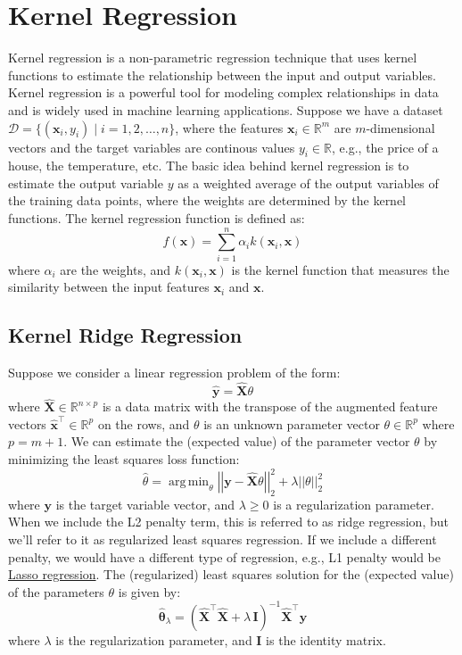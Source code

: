 \documentclass{article}[11pt]
\def\R{\mathbb{R}}
\def\D{\mathcal{D}}
\newcommand{\norm}[1]{\left|\left|#1\right|\right|}
\DeclareMathOperator*{\argmin}{arg\,min}
\begin{document}
\section{Kernel Regression}
Kernel regression is a non-parametric regression technique that uses kernel functions to estimate the relationship between the input and output variables.
Kernel regression is a powerful tool for modeling complex relationships in data and is widely used in machine learning applications.
Suppose we have a dataset $\D = \{(\mathbf{x}_{i},y_{i}) \mid i = 1,2,\dots,n\}$, where the features $\mathbf{x}_i \in \mathbb{R}^{m}$ 
are $m$-dimensional vectors and the target variables are continous values $y_i \in \mathbb{R}$, e.g., the price of a house, the temperature, etc.
The basic idea behind kernel regression is to estimate the output variable $y$ as a weighted average of the output variables of the training data points, 
where the weights are determined by the kernel functions. The kernel regression function is defined as:
\begin{equation}
f(\mathbf{x}) = \sum_{i=1}^{n} \alpha_i k(\mathbf{x}_i, \mathbf{x})
\end{equation}
where $\alpha_i$ are the weights, and $k(\mathbf{x}_i, \mathbf{x})$ is the kernel function that measures the similarity between the input features $\mathbf{x}_i$ and $\mathbf{x}$.

\subsection{Kernel Ridge Regression}
Suppose we consider a linear regression problem of the form:
\begin{equation}
\hat{\mathbf{y}} = \hat{\mathbf{X}}\theta
\end{equation}
where $\hat{\mathbf{X}}\in\R^{n\times{p}}$ is a data matrix with the transpose of the augmented feature vectors $\hat{\mathbf{x}}^{\top}\in\R^{p}$ on the rows, and $\theta$ is an unknown parameter vector $\theta\in\mathbb{R}^{p}$ 
where $p = m+1$. We can estimate the (expected value) of the parameter vector $\theta$ by minimizing the least squares loss function:
\begin{equation}
\hat{\theta} = \argmin_{\theta} \norm{\mathbf{y} - \hat{\mathbf{X}}\theta}_{2}^{2} + \lambda\norm{\theta}_{2}^{2}
\end{equation}
where $\mathbf{y}$ is the target variable vector, and $\lambda\geq{0}$ is a regularization parameter. 
When we include the L2 penalty term, this is referred to as ridge regression, but we'll refer to it as regularized least squares regression.
If we include a different penalty, we would have a different type of regression, e.g., L1 penalty would be \href{https://en.wikipedia.org/wiki/Lasso_(statistics)}{Lasso regression}.
The (regularized) least squares solution for the (expected value) of the parameters $\theta$ is given by:
\begin{equation}
\hat{\mathbf{\theta}}_{\lambda} = \left(\hat{\mathbf{X}}^{\top}\hat{\mathbf{X}}+\lambda\,\mathbf{I}\right)^{-1}\hat{\mathbf{X}}^{\top}\mathbf{y}
\end{equation}
where $\lambda$ is the regularization parameter, and $\mathbf{I}$ is the identity matrix.
\end{document}
